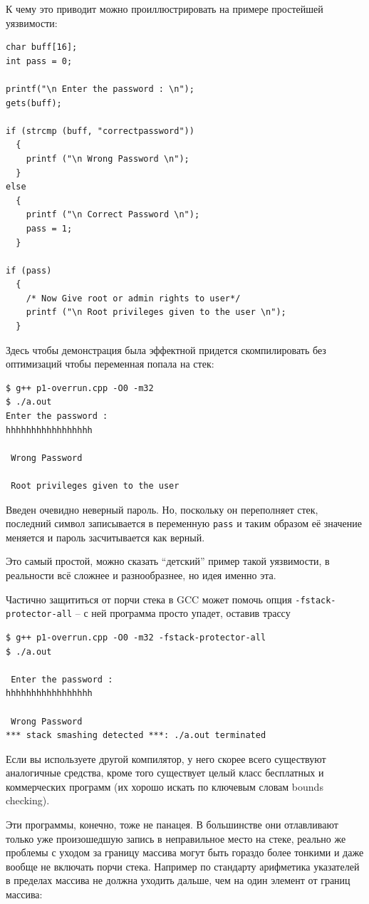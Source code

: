 \documentclass[a4paper,12pt,oneside]{article}
\begin{document}
К чему это приводит можно проиллюстрировать на примере простейшей уязвимости:

\begin{lstlisting}
char buff[16];
int pass = 0;

printf("\n Enter the password : \n");
gets(buff);

if (strcmp (buff, "correctpassword"))
  {
    printf ("\n Wrong Password \n");
  }
else
  {
    printf ("\n Correct Password \n");
    pass = 1;
  }

if (pass)
  {
    /* Now Give root or admin rights to user*/
    printf ("\n Root privileges given to the user \n");
  }
\end{lstlisting}

Здесь чтобы демонстрация была эффектной придется скомпилировать без оптимизаций чтобы переменная попала на стек:

\begin{verbatim}
$ g++ p1-overrun.cpp -O0 -m32
$ ./a.out
Enter the password : 
hhhhhhhhhhhhhhhhh

 Wrong Password 

 Root privileges given to the user 
\end{verbatim}

Введен очевидно неверный пароль. Но, поскольку он переполняет стек, последний символ записывается в переменную \lstinline!pass! и таким образом её значение меняется и пароль засчитывается как верный.

Это самый простой, можно сказать ``детский'' пример такой уязвимости, в реальности всё сложнее и разнообразнее, но идея именно эта.

Частично защититься от порчи стека в GCC может помочь опция \lstinline!-fstack-protector-all! -- с ней программа просто упадет, оставив трассу

\begin{verbatim}
$ g++ p1-overrun.cpp -O0 -m32 -fstack-protector-all
$ ./a.out 

 Enter the password : 
hhhhhhhhhhhhhhhhh

 Wrong Password 
*** stack smashing detected ***: ./a.out terminated
\end{verbatim}

Если вы используете другой компилятор, у него скорее всего существуют аналогичные средства, кроме того существует целый класс бесплатных и коммерческих программ (их хорошо искать по ключевым словам bounds checking).

Эти программы, конечно, тоже не панацея. В большинстве они отлавливают только уже произошедшую запись в неправильное место на стеке, реально же проблемы с уходом за границу массива могут быть гораздо более тонкими и даже вообще не включать порчи стека. Например по стандарту арифметика указателей в пределах массива не должна уходить дальше, чем на один элемент от границ массива:
\end{document}
